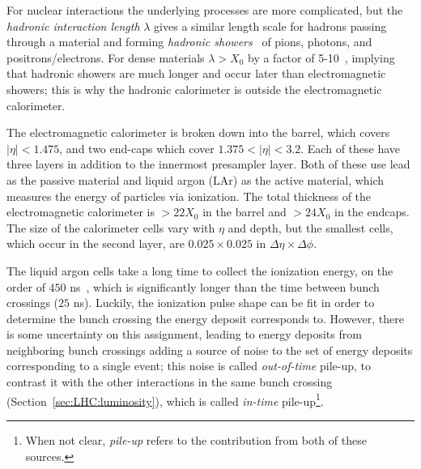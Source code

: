 For nuclear interactions the underlying processes are more complicated, but the \textit{hadronic interaction length} $\lambda$ gives a similar length scale for hadrons passing through a material and forming \textit{hadronic showers}~\cite{TASI_day3_school} of pions, photons, and positrons/electrons.
For dense materials $\lambda > X_0$ by a factor of 5-10~\cite{Lechner:2674116}, implying that hadronic showers are much longer and occur later than electromagnetic showers; this is why the hadronic calorimeter is outside the electromagnetic calorimeter.

The electromagnetic calorimeter is broken down into the barrel, which covers $|\eta|<1.475$, and two end-caps which cover $1.375<|\eta|<3.2$.
Each of these have three layers in addition to the innermost presampler layer.
Both of these use lead as the passive material and liquid argon (LAr) as the active material, which measures the energy of particles via ionization.
The total thickness of the electromagnetic calorimeter is $>22 X_0$ in the barrel and $>24 X_0$ in the endcaps.
The size of the calorimeter cells vary with $\eta$ and depth, but the smallest cells, which occur in the second layer, are $0.025 \times 0.025$ in $\Delta\eta \times \Delta\phi$.

The liquid argon cells take a long time to collect the ionization energy, on the order of $450$ ns~\cite{Abreu:2010zzc}, which is significantly longer than the time between bunch crossings ($25$ ns).
Luckily, the ionization pulse shape can be fit in order to determine the bunch crossing the energy deposit corresponds to.
However, there is some uncertainty on this assignment, leading to energy deposits from neighboring bunch crossings adding a source of noise to the set of energy deposits corresponding to a single event; this noise is called \textit{out-of-time} pile-up, to contrast it with the other interactions in the same bunch crossing (Section~\ref{sec:LHC:luminosity}), which is called \textit{in-time} pile-up\footnote{When not clear, \textit{pile-up} refers to the contribution from both of these sources.}.

